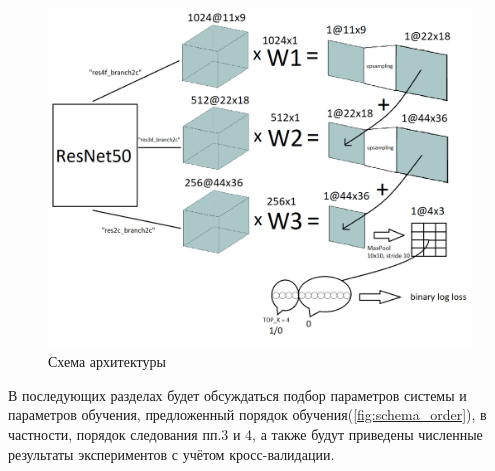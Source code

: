 \begin{figure}[h] 
  \center
  \includegraphics [scale=0.6] {images/schema_total.png}
  \caption{Схема архитектуры} 
  \label{fig:schema_total}  
\end{figure}

В последующих разделах будет обсуждаться подбор параметров системы и параметров обучения, предложенный порядок обучения(\ref{fig:schema_order}), в частности, порядок следования пп.3 и 4, а также будут приведены численные результаты экспериментов с учётом кросс-валидации.



\clearpage